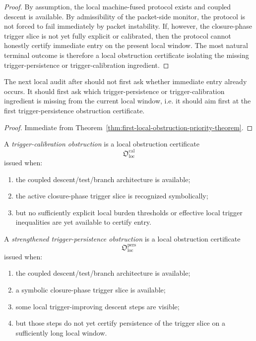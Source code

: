 \begin{proof}
By assumption, the local machine-fused protocol exists and coupled descent is available.
By admissibility of the packet-side monitor, the protocol is not forced to fail immediately by packet instability.
If, however, the closure-phase trigger slice is not yet fully explicit or calibrated, then the protocol cannot honestly certify immediate entry on the present local window.
The most natural terminal outcome is therefore a local obstruction certificate isolating the missing trigger-persistence or trigger-calibration ingredient.
\end{proof}

\begin{corollary}
\label{cor:first-post-v3320-local-audit-rule}
The next local audit after  should not first ask whether immediate entry already occurs.
It should first ask which trigger-persistence or trigger-calibration ingredient is missing from the current local window, i.e. it should aim first at the first trigger-persistence obstruction certificate.
\end{corollary}

\begin{proof}
Immediate from Theorem~\ref{thm:first-local-obstruction-priority-theorem}.
\end{proof}


\begin{definition}
\label{def:trigger-calibration-obstruction}
A \emph{trigger-calibration obstruction} is a local obstruction certificate
\[
\mathfrak{O}_{\mathrm{loc}}^{\mathrm{cal}}
\]
issued when:
\begin{enumerate}
 \item the coupled descent/test/branch architecture is available;
 \item the active closure-phase trigger slice is recognized symbolically;
 \item but no sufficiently explicit local burden thresholds or effective local trigger inequalities are yet available to certify entry.
\end{enumerate}
\end{definition}

\begin{definition}
\label{def:trigger-persistence-obstruction-strengthened-reading}
A \emph{strengthened trigger-persistence obstruction} is a local obstruction certificate
\[
\mathfrak{O}_{\mathrm{loc}}^{\mathrm{pers}}
\]
issued when:
\begin{enumerate}
 \item the coupled descent/test/branch architecture is available;
 \item a symbolic closure-phase trigger slice is available;
 \item some local trigger-improving descent steps are visible;
 \item but those steps do not yet certify persistence of the trigger slice on a sufficiently long local window.
\end{enumerate}
\end{definition}


